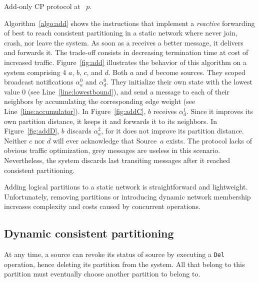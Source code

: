 \begin{algorithm}
  
  \caption{\label{algo:add}Add-only CP protocol at \Process~$p$.}
\end{algorithm}

Algorithm~\ref{algo:add} shows the instructions that implement a
\emph{reactive} forwarding of best to reach consistent partitioning in
a static network where \processes never join, crash, nor leave the
system. As soon as a \process receives a better message, it delivers
and forwards it. The trade-off consists in decreasing termination time
at cost of increased traffic.  Figure~\ref{fig:add} illustrates the
behavior of this algorithm on a system comprising 4 \processes $a$,
$b$, $c$, and $d$. Both $a$ and $d$ become sources.  They scoped broadcast
notifications $\alpha_a^0$ and $\alpha_d^0$. They initialize their own
state with the lowest value $0$ (see Line~\ref{line:lowestbound}), and
send a message to each of their neighbors by accumulating the
corresponding edge weight (see Line~\ref{line:accumulator}). In
Figure~\ref{fig:addC}, $b$ receives $\alpha_{d}^{1}$. Since it
improves its own partition distance, it keeps it and forwards it to
its neighbors. In Figure~\ref{fig:addD}, $b$ discards
$\alpha_{a}^{2}$, for it does not improve its partition
distance. Neither $c$ nor $d$ will ever acknowledge that Source~$a$
exists.  The protocol lacks of obvious traffic optimization, \eg grey
messages are useless in this scenario. Nevertheless, the system
discards last transiting messages after it reached consistent
partitioning.

Adding logical partitions to a static network is straightforward and
lightweight. Unfortunately, removing partitions or introducing dynamic
network membership increases complexity and costs caused by concurrent
operations.

\subsection{Dynamic consistent partitioning}
\label{subsec:dynamic}

At any time, a source can revoke its status of source by executing a
\texttt{Del} operation, hence deleting its partition from the
system. All \processes that belong to this partition must eventually
choose another partition to belong to.




